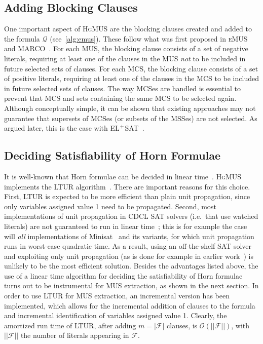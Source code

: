 \documentclass{llncs}
\newcommand{\tn}{\textnormal}
\newcommand{\fml}[1]{{\mathcal{#1}}}
\newcommand{\hgmus}{\textsc{HgMUS}\xspace}
\newcommand{\emus}{\textsc{eMUS}\xspace}
\newcommand{\elsat}{EL$^{\tn{+}}$SAT\xspace}
\begin{document}
\subsection{Adding Blocking Clauses}

One important aspect of \hgmus are the blocking clauses created and
added to the formula $\fml{Q}$ (see~\autoref{alg:emus}).
These follow what was first proposed in \emus~\cite{pms-aaai13} and
MARCO~\cite{liffiton-cpaior13,lpmms-cj15}.
For each MUS, the blocking clause consists of a set of negative
literals, requiring at least one of the clauses in the MUS {\em not}
to be included in future selected sets of clauses. For each MCS, the
blocking clause consists of a set of positive literals, requiring at
least one of the clauses in the MCS to be included in future selected
sets of clauses.
The way MCSes are handled is essential to prevent that MCS and sets
containing the same MCS to be selected again.
Although conceptually simple, it can be shown that existing approaches
may not guarantee that supersets of MCSes (or subsets of the MSSes)
are not selected. As argued later, this is the case with
\elsat~\cite{vescovi-phd11,sebastiani-tr15}.


\subsection{Deciding Satisfiability of Horn Formulae}

It is well-known that Horn formulae can be decided in linear
time~\cite{gallier-jlp84,itai-jlp87,minoux-ipl88}.
\hgmus implements the LTUR algorithm~\cite{minoux-ipl88}. 
There are important reasons for this choice. First, LTUR is expected
to be more efficient than plain unit propagation, since only variables
assigned value 1 need to be propagated. Second, most implementations
of unit propagation in CDCL SAT solvers (i.e.\ that use watched
literals) are not guaranteed to run in linear time~\cite{gent-jair13};
this is for example the case will {\em all} implementations of
Minisat~\cite{een-sat03} and its variants, for which unit propagation
runs in worst-case quadratic time. As a result, using an off-the-shelf
SAT solver and exploiting only unit propagation (as is done for
example in earlier
work~\cite{sebastiani-cade09,sebastiani-tr15,mp-tr15}) is unlikely to
be the most efficient solution.
Besides the advantages listed above, the use of a linear time
algorithm for deciding the satisfiability of Horn formulae turns out
to be instrumental for MUS extraction, as shown in the next section.
In order to use LTUR for MUS extraction, an incremental version has
been implemented, which allows for the incremental addition of clauses
to the formula and incremental identification of variables assigned
value 1. Clearly, the amortized run time of LTUR, after adding $m =
|\fml{F}|$ clauses, is $\fml{O}(||\fml{F}||)$, with $||\fml{F}||$ the
number of literals appearing in $\fml{F}$.
\end{document}
